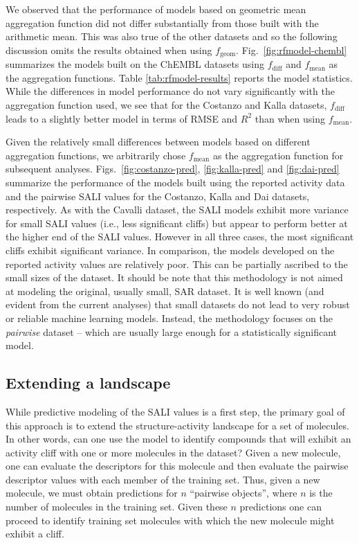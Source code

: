 \documentclass[letterpaper, 12pt]{article}
\begin{document}
We observed that the performance of models based on geometric mean aggregation function did not
differ substantially from those built with the arithmetic mean. This was also true of the other
datasets and so the following discussion omits the results obtained when using
$f_{\textrm{geom}}$. Fig.~\ref{fig:rfmodel-chembl} summarizes the models built on the ChEMBL
datasets using $f_{\textrm{diff}}$ and $f_{\textrm{mean}}$ as the aggregation functions. Table
\ref{tab:rfmodel-results} reports the model statistics.  While the differences in model performance
do not vary significantly with the aggregation function used, we see that for the Costanzo and Kalla
datasets, $f_{\textrm{diff}}$ leads to a slightly better model in terms of RMSE and $R^2$ than when
using $f_{\textrm{mean}}$.


Given the relatively small differences between models based on different aggregation functions, we
arbitrarily chose $f_{\textrm{mean}}$ as the aggregation function for subsequent
analyses. Figs.~\ref{fig:costanzo-pred}, \ref{fig:kalla-pred} and \ref{fig:dai-pred} summarize the
performance of the models built using the reported activity data and the pairwise SALI values for
the Costanzo, Kalla and Dai datasets, respectively. As with the Cavalli dataset, the SALI models
exhibit more variance for small SALI values (i.e., less significant cliffs) but appear to perform
better at the higher end of the SALI values. However in all three cases, the most significant cliffs
exhibit significant variance. In comparison, the models developed on the reported activity values
are relatively poor. This can be partially ascribed to the small sizes of the dataset. It should be
note that this methodology is not aimed at modeling the original, usually small, SAR dataset. It is
well known (and evident from the current analyses) that small datasets do not lead to very robust or
reliable machine learning models. Instead, the methodology focuses on the \emph{pairwise} dataset --
which are usually large enough for a statistically significant model.

\subsection{Extending a landscape}
\label{sec:extending-landscape}

While predictive modeling of the SALI values is a first step, the primary goal of this approach is
to extend the structure-activity landscape for a set of molecules. In other words, can one use the
model to identify compounds that will exhibit an activity cliff with one or more molecules in the
dataset? Given a new molecule, one can evaluate the descriptors for this molecule and then evaluate
the pairwise descriptor values with each member of the training set. Thus, given a new molecule, we
must obtain predictions for $n$ ``pairwise objects'', where $n$ is the number of molecules in the
training set. Given these $n$ predictions one can proceed to identify training set molecules with
which the new molecule might exhibit a cliff.
\end{document}
